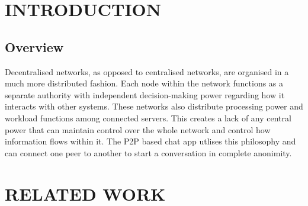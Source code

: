 \documentclass{fisatproject}
\begin{document}
\restoregeometry
\tableofcontents

\newpage
\pagestyle{fancy}


\chapter{INTRODUCTION}
\setcounter{page}{1}
\renewcommand{\baselinestretch}{1.50}
\section{Overview}
Decentralised networks, as opposed to centralised networks, are organised in a much more distributed fashion. Each node within the network functions as a separate authority with independent decision-making power regarding how it interacts with other systems. These networks also distribute processing power and workload functions among connected servers. This creates a lack of any central power that can maintain control over the whole network and control how information flows within it. The P2P based chat app utlises this philosophy and can connect one peer to another to start a conversation in complete anonimity.


\chapter{RELATED WORK}
\end{document}

